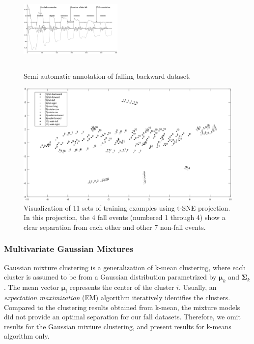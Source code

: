 \documentclass[]{IEEEtran}
\begin{document}
\begin{figure}[b]
\centering
\includegraphics[width=0.45\textwidth,height = 1.7in]{figures/human_falling_backward2_bw.eps} 
\caption{Semi-automatic annotation of falling-backward dataset.}
 \label{fig:automatic_annotation2} 
\end{figure}

\begin{figure}[!bht]
\centering
\includegraphics[width=.85\textwidth]{figures/viz_all_training_examples_crop2_bw.eps} 
\caption{Visualization of 11 sets of training examples using t-SNE projection.
In this projection, the 4 fall events (numbered 1 through 4) show a clear
separation from each other and other 7 non-fall events.}
\label{fig:automatic_annotation3} 
\end{figure}

\subsubsection{Multivariate Gaussian Mixtures}
Gaussian mixture clustering is a generalization of k-mean clustering, where
each cluster is assumed to be from a Gaussian distribution parametrized by
$\boldsymbol{\mu}_k$ and $\boldsymbol{\Sigma}_k$. The mean vector
$\boldsymbol{\mu}_i$ represents the center of the cluster $i$.  Usually, an
\emph{expectation maximization} (EM) algorithm iteratively identifies the
clusters. Compared to the clustering results obtained from k-mean, the mixture
models did not provide an optimal separation for our fall datasets. Therefore,
we omit results for the Gaussian mixture clustering, and present results for
k-means algorithm only. 
\end{document}
